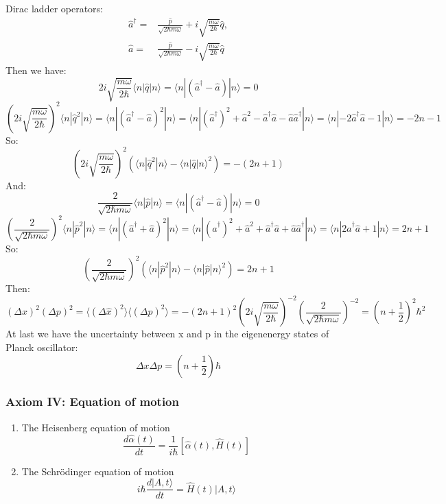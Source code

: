 \documentclass[12pt]{article}
\numberwithin{equation}{section}
\begin{document}
\begin{enumerate}
	Dirac ladder operators:
	\begin{equation}\begin{split}
	\hat{a}^\dag=&\frac{\hat{p}}{\sqrt{2\hbar m\omega}}+i\sqrt{\frac{m\omega}{2\hbar}}\hat{q},\\
	\hat{a}=&\frac{\hat{p}}{\sqrt{2\hbar m\omega}}-i\sqrt{\frac{m\omega}{2\hbar}}\hat{q}
	\end{split}\end{equation}
	Then we have:
	\[2i\sqrt{\frac{m\omega}{2\hbar}}\langle n|\hat{q}|n\rangle=\langle n|(\hat{a}^\dag-\hat{a})|n\rangle=0\]
	\[(2i\sqrt{\frac{m\omega}{2\hbar}})^2\langle n|\hat{q}^2|n\rangle
	=\langle n|(\hat{a}^\dag-\hat{a})^2|n\rangle
	=\langle n|(\hat{a}^\dag)^2+\hat{a}^2-\hat{a}^{\dag} \hat{a}-\hat{a}\hat{a}^{\dag}|n\rangle
	=\langle n|-2\hat{a}^\dag\hat{a}-1|n \rangle=-2n-1\]
	So:
	\[(2i\sqrt{\frac{m\omega}{2\hbar}})^2(\langle n|\hat{q}^2|n\rangle-\langle n|\hat{q}|n\rangle^2)=-(2n+1)\]
	And:
	\[\frac{2}{\sqrt{2\hbar m\omega}}\langle n|\hat{p}|n\rangle=\langle n|(\hat{a}^\dag-\hat{a})|n\rangle=0\]
	\[(\frac{2}{\sqrt{2\hbar m\omega}})^2\langle n|\hat{p}^2|n\rangle
	=\langle n|(\hat{a}^\dag+\hat{a})^2|n\rangle
	=\langle n|(\hat{a}^\dag)^2+\hat{a}^2+\hat{a}^{\dag} \hat{a}+\hat{a}\hat{a}^{\dag}|n\rangle
	=\langle n|2\hat{a}^\dag\hat{a}+1|n \rangle=2n+1\]
	So:
	\[(\frac{2}{\sqrt{2\hbar m\omega}})^2(\langle n|\hat{p}^2|n\rangle-\langle n|\hat{p}|n\rangle^2)=2n+1\]
	Then:
	\[(\Delta x)^2(\Delta p)^2=\langle(\Delta \hat{x})^2 \rangle \langle(\Delta \hat{p})^2 \rangle=-(2n+1)^2(2i\sqrt{\frac{m\omega}{2\hbar}})^{-2}(\frac{2}{\sqrt{2\hbar m\omega}})^{-2}=(n+\frac{1}{2})^2\hbar^2\]
	At last we have the uncertainty between x and p in the eigenenergy states of Planck oscillator:
	\begin{equation}\Delta x\Delta p=(n+\frac{1}{2})\hbar\end{equation}
\end{enumerate}
\subsubsection{Axiom IV: Equation of motion}
\begin{enumerate}
\item The Heisenberg equation of motion
	\begin{equation}\frac{d\hat{\alpha}(t)}{dt}=\frac{1}{i\hbar}[\hat{\alpha}(t), \hat{H}(t)]\end{equation}
\item The Schr\"{o}dinger equation of motion
	\begin{equation}i\hbar\frac{d|A, t\rangle}{dt}=\hat{H}(t)|A, t\rangle\end{equation}
\end{enumerate}
\end{document}
